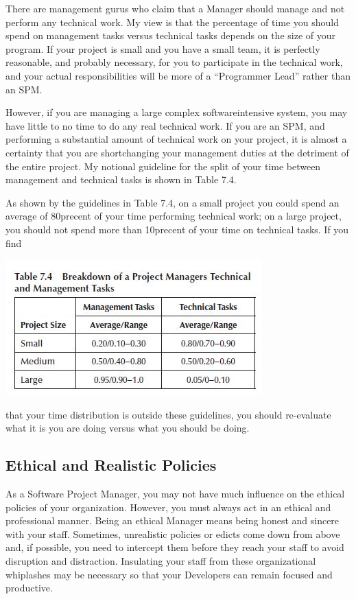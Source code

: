 \documentclass{book}
\begin{document}
There are management gurus who claim that a Manager
should manage and not perform any technical work. My
view is that the percentage of time you should spend on management
tasks versus technical tasks depends on the size of
your program. If your project is small and you have a small
team, it is perfectly reasonable, and probably necessary, for
you to participate in the technical work, and your actual
responsibilities will be more of a “Programmer Lead” rather
than an SPM.

However, if you are managing a large complex softwareintensive
system, you may have little to no time to do any
real technical work. If you are an SPM, and performing a
substantial amount of technical work on your project, it is
almost a certainty that you are shortchanging your management
duties at the detriment of the entire project. My
notional guideline for the split of your time between management
and technical tasks is shown in Table 7.4.

As shown by the guidelines in Table 7.4, on a small project
you could spend an average of 80precent of your time performing
technical work; on a large project, you should not spend
more than 10precent of your time on technical tasks. If you find

\includegraphics{1.jpg}

that your time distribution is outside these guidelines, you
should re-evaluate what it is you are doing versus what you
should be doing.

\subsection{Ethical and Realistic Policies}

As a Software Project Manager, you may not have much
influence on the ethical policies of your organization.
However, you must always act in an ethical and professional
manner. Being an ethical Manager means being honest and
sincere with your staff. Sometimes, unrealistic policies or
edicts come down from above and, if possible, you need to
intercept them before they reach your staff to avoid disruption
and distraction. Insulating your staff from these organizational
whiplashes may be necessary so that your Developers
can remain focused and productive.
\end{document}
